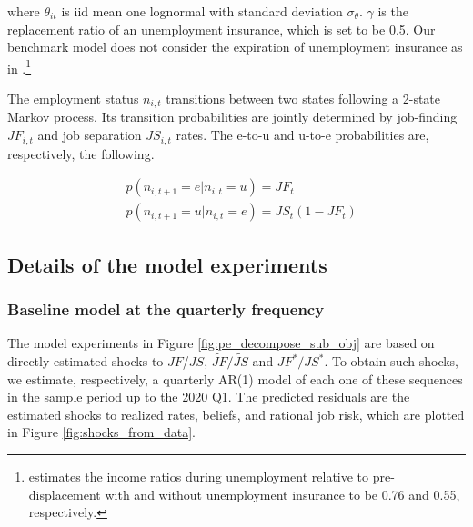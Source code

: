 where $\theta_{it}$ is iid mean one lognormal with standard deviation $\sigma_\theta$. 
$\gamma$ is the replacement ratio of an unemployment insurance, which is set to be 0.5. Our benchmark model does not consider the expiration of unemployment insurance as in \cite{kekre2023unemployment}.\footnote{\cite{kekre2023unemployment} estimates the income ratios during unemployment relative to pre-displacement with and without unemployment insurance to be 0.76 and 0.55, respectively.} 

The employment status $n_{i,t}$ transitions between two states following a 2-state Markov process. Its transition probabilities are jointly determined by job-finding $JF_{i,t}$ and job separation $JS_{i,t}$ rates. The e-to-u and u-to-e probabilities are, respectively, the following. 


\begin{align*}
 & p(n_{i,t+1}=e|n_{i,t}=u) = JF_{t} \\
& p(n_{i,t+1}=u|n_{i,t}=e) = JS_{t} (1  - JF_{t} )
\end{align*}





\subsection{Details of the model experiments}
\label{appendix:model_results}

\subsubsection{Baseline model at the quarterly frequency}

The model experiments in Figure \ref{fig:pe_decompose_sub_obj} are based on directly estimated shocks to $JF$/$JS$, $\widetilde{JF}/\widetilde{JS}$ and ${JF}^*/{JS}^*$. To obtain such shocks, we estimate, respectively, a quarterly AR(1) model of each one of these sequences in the sample period up to the 2020 Q1. The predicted residuals are the estimated shocks to realized rates, beliefs, and rational job risk, which are plotted in Figure \ref{fig:shocks_from_data}. 

